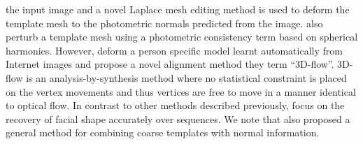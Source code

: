 the input image and a novel Laplace mesh editing method is used to deform the
template mesh to the photometric normals predicted from the image.
\citet{Suwajanakorn:2014bl} also perturb a template mesh using a photometric
consistency term based on spherical harmonics.
However, \citet{Suwajanakorn:2014bl} deform a person
specific model learnt automatically from Internet images and propose a novel
alignment method they term ``3D-flow''. 3D-flow is an analysis-by-synthesis
method where no statistical constraint is placed on the vertex movements
and thus vertices are free to move in a manner identical to optical flow. In
contrast to other methods described previously, \citet{Suwajanakorn:2014bl}
focus on the recovery of facial shape accurately over sequences.
We note that \citet{nehab2005efficiently} also proposed a general method
for combining coarse templates with normal information.

